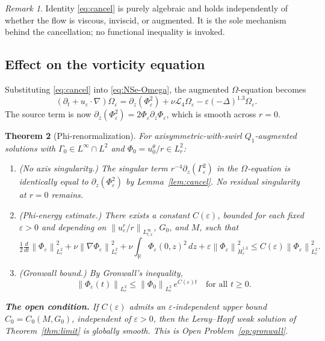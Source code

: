 \documentclass{article}
\newtheorem{theorem}{Theorem}[section]
\theoremstyle{definition}
\theoremstyle{remark}
\newtheorem{remark}[theorem]{Remark}
\newcommand{\R}{\mathbb{R}}
\newcommand{\e}{\varepsilon}
\newcommand{\half}{\tfrac{1}{2}}
\newcommand{\Lc}{\mathcal{L}}
\newcommand{\norm}[1]{\left\|#1\right\|}
\newcommand{\ddt}{\tfrac{d}{dt}}
\begin{document}
\begin{remark}
  Identity \eqref{eq:cancel} is purely algebraic and holds
  independently of whether the flow is viscous, inviscid, or augmented.
  It is the sole mechanism behind the cancellation; no functional
  inequality is invoked.
\end{remark}

\subsection{Effect on the vorticity equation}

Substituting \eqref{eq:cancel} into \eqref{eq:NSe-Omega}, the augmented
$\Omega$-equation becomes
\begin{equation}\label{eq:Omega-renorm}
  (\partial_t + u_\e\cdot\nabla)\Omega_\e
  = \partial_z(\Phi_\e^2)
  + \nu\Lc_4\Omega_\e
  - \e(-\Delta)^{1.3}\Omega_\e.
\end{equation}
The source term is now $\partial_z(\Phi_\e^2) = 2\Phi_\e\partial_z\Phi_\e$,
which is smooth across $r=0$.

\begin{theorem}[Phi-renormalization]\label{thm:phi}
  For axisymmetric-with-swirl $Q_1$-augmented solutions with
  $\Gamma_0\in L^\infty\cap L^2$ and $\Phi_0 = u_0^\theta/r \in L^2_r$:
  \begin{enumerate}
  \item[\textup{(i)}]
    \emph{(No axis singularity.)}
    The singular term $r^{-4}\partial_z(\Gamma_\e^2)$ in the
    $\Omega$-equation is identically equal to $\partial_z(\Phi_\e^2)$
    by Lemma~\ref{lem:cancel}.  No residual singularity at $r=0$
    remains.

  \item[\textup{(ii)}]
    \emph{(Phi-energy estimate.)}
    There exists a constant $C(\e)$, bounded for each fixed $\e > 0$
    and depending on $\norm{u^r_\e/r}_{L^\infty_{t,x}}$, $G_0$, and
    $M$, such that
    \begin{equation}\label{eq:phi-energy}
      \half\ddt\norm{\Phi_\e}_{L^2_r}^2
      + \nu\norm{\nabla\Phi_\e}_{L^2_r}^2
      + \nu\int_{\R}\!\Phi_\e(0,z)^2\,dz
      + \e\norm{\Phi_\e}_{\dot H^{1.3}_r}^2
      \le C(\e)\norm{\Phi_\e}_{L^2_r}^2.
    \end{equation}

  \item[\textup{(iii)}]
    \emph{(Gronwall bound.)}
    By Gronwall's inequality,
    \begin{equation}\label{eq:phi-gronwall}
      \norm{\Phi_\e(t)}_{L^2_r}
      \le \norm{\Phi_0}_{L^2_r}\,e^{C(\e)t}
      \quad\text{for all } t\ge 0.
    \end{equation}
  \end{enumerate}
  
  \medskip\noindent
  \textbf{The open condition.}\enspace
  If $C(\e)$ admits an $\e$-independent upper bound
  $C_0 = C_0(M, G_0)$, independent of $\e > 0$, then the Leray--Hopf
  weak solution of Theorem~\ref{thm:limit} is globally smooth.
  This is Open Problem~\ref{op:gronwall}.
\end{theorem}
\end{document}
